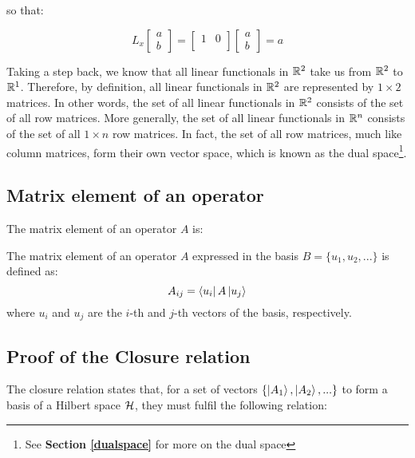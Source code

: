 so that:

\begin{equation}
    L_x\begin{bmatrix}
        a \\ b
    \end{bmatrix} =
    \begin{bmatrix}
        1 & 0 \\
    \end{bmatrix}
    \begin{bmatrix}
        a \\ b
    \end{bmatrix} = a
\end{equation}

Taking a step back, we know that all linear functionals in $\mathbb{R}^2$ take us from $\mathbb{R}^2$ to $\mathbb{R}^1$. Therefore, by definition, all linear functionals in $\mathbb{R}^2$ are represented by $1\times2$ matrices. In other words, the set of all linear functionals in $\mathbb{R}^2$ consists of the set of all row matrices. More generally, the set of all linear functionals in $\mathbb{R}^n$ consists of the set of all $1\times n$ row matrices. In fact, the set of all row matrices, much like column matrices, form their own vector space, which is known as the dual space\footnote{See \textbf{Section \ref{dualspace}} for more on the dual space}.

\subsection{Matrix element of an operator}

The matrix element of an operator $A$ is:
\begin{definition}
    The matrix element of an operator $A$ expressed in the basis $B = \{u_1, u_2, ...\}$ is defined as:
    \begin{equation}
        A_{ij} = \bra{u_i}A\ket{u_j}
    \end{equation}
    where $u_i$ and $u_j$ are the $i$-th and $j$-th vectors of the basis, respectively.
\end{definition}

\subsection{Proof of the Closure relation} \label{closure_relation_proof}

The closure relation states that, for a set of vectors $\{\ket{A_1}, \ket{A_2}, ...\}$ to form a basis of a Hilbert space $\mathcal{H}$, they must fulfil the following relation:

